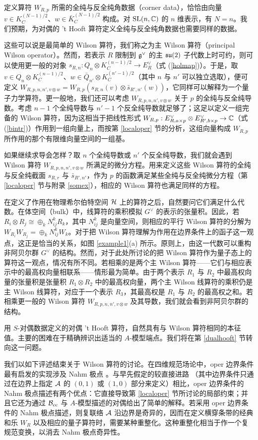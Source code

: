 定义算符 $W_{R,p}$ 所需的全纯与反全纯角数据（corner data），恰恰由向量 $v\in K_C^{(N-1)/2}$、$w\in \bar K_C^{(N-1)/2}$ 构成。对 ${\mathrm{SL}}(n,{\mathbb C})$ 的 $n$ 维表示，有 $N=n$。我们预期，为对偶的 't Hooft 算符定义全纯与反全纯角数据也需要同样的数据。


这些可以说是最简单的 Wilson 算符，我们称之为主 Wilson 算符（principal Wilson operator）。然而，若表示 $R$ 限制到 ${\mathfrak g}^\vee$ 的主 ${\mathfrak {su}}(2)$ 子代数上时可约，则可以使用更一般的对象 $s_{R,n}:Q_n\otimes K_C^{(n-1)/2}\to E^\vee_R$（式 (\ref{holmap})）。于是，取 $v\in Q_n \otimes K_C^{(n-1)/2}$、$w\in \bar Q_{n'}\otimes K_C^{(n'-1)/2}$（其中 $n$ 与 $n'$ 可以独立选取），便可定义 $W_{R,p,n,n',v\otimes w}=W_{R,p}(s_{R,n}(v)\otimes \bar s_{R',n'}(w))$，它同样可以解释为一个量子力学算符。更一般地，我们还可以考虑 $W_{R,p,n,n',v\otimes w} $ 关于 $p$ 的全纯与反全纯导数。考虑 $n-1$ 个全纯导数与 $n'-1$ 个反全纯导数就足够了；这足以定义一组完备的 Wilson 算符，因为这相当于把线性形式 $W_{R,p}:E^\vee_{R,a\times p}\otimes E^\vee_{R',b\times p}\to {\mathbb C} $（式 (\ref{bintr})）作用到一组向量上，而按第 \ref{localoper} 节的分析，这组向量构成 $W_{R,p}$ 所作用的那个有限维向量空间的一组基。

如果继续求导会怎样？取 $n$ 个全纯导数或 $n'$ 个反全纯导数，我们就会遇到 Wilson 算符 $W_{R,p,n,n',v\otimes w} $ 所满足的微分方程。用来定义这些 Wilson 算符的全纯与反全纯截面 $ s_{R,r}$ 与 $\bar s_{R',n'}$，作为 $p$ 的函数满足某些全纯与反全纯微分方程（第 \ref{localoper} 节与附录 \ref{somex}），相应的 Wilson 算符也满足同样的方程。


在定义了作用在物理希尔伯特空间 ${\mathcal H}$ 上的算符之后，自然要问它们满足什么代数。在体空间（bulk）中，线算符的乘积模拟 $G^\vee $ 的表示的张量积。因此，若 $R_i\otimes R_j\cong \oplus_k N^k_{ij}R_k$，其中 $N^k_{ij}$ 是向量空间，则相应的平行 Wilson 算符的分解为 $W_{R_i} W_{R_j}=\oplus_k N^k_{ij} W_k$。对于把 Wilson 算符理解为作用在边界条件上的函子这一观点，这正是恰当的关系，如图 \ref{example1}(a) 所示。原则上，由这一代数可以重构非阿贝尔群 $G^\vee $ 的结构。然而，对于此处所讨论的把 Wilson 算符作为量子态上的算符这一观点，情况有所不同。若相乘的是两个主 Wilson 算符——它们与相应表示中的最高权向量相联系——情形最为简单。由于两个表示 $R_1$ 与 $R_2$ 中最高权向量的张量积是张量积 $R_1\otimes R_2$ 中的最高权向量，两个主 Wilson 线算符的乘积仍是主 Wilson 线算符，对应于一个表示 $R_3$，其最高权是 $R_1$ 与 $R_2$ 的最高权之和。若相乘更一般的 Wilson 算符 $W_{R,p,n,n',v\otimes w}$ 及其导数，我们就会看到非阿贝尔群的结构。

用 $S$-对偶数据定义的对偶 't Hooft 算符，自然具有与 Wilson 算符相同的本征值。主要的困难在于精确辨识出适当的 $A$-模型端点。我们将在第 \ref{dualhooft} 节转向这一问题。

我们以如下评述结束关于 Wilson 算符的讨论。在四维规范场论中，oper 边界条件最有启发的实现涉及 Nahm 极点 \cite{GWknots}。与早先假定的较直接进路 \cite{KW}（其中边界条件只通过在边界上指定 ${\mathcal A}$ 的 $(0,1)$ 或 $(1,0)$ 部分来定义）相比，oper 边界条件的 Nahm 极点描述有两个优点：它直接导致第 \ref{localoper} 节所讨论的局部约束；并且它还为通过 ${\mathcal B}_{\mathrm{cc}}$ 与 $A$-模型描述的对偶给出了简单的解释。若采用 oper 边界条件的 Nahm 极点描述，则复联络 ${\mathcal A}$ 沿边界是奇异的，因而在定义横穿条带的经典和乐 $W_R$ 以及相应的量子算符时，需要某种重整化。这种重整化相当于作一个复规范变换，以消去 Nahm 极点奇异性。


   

